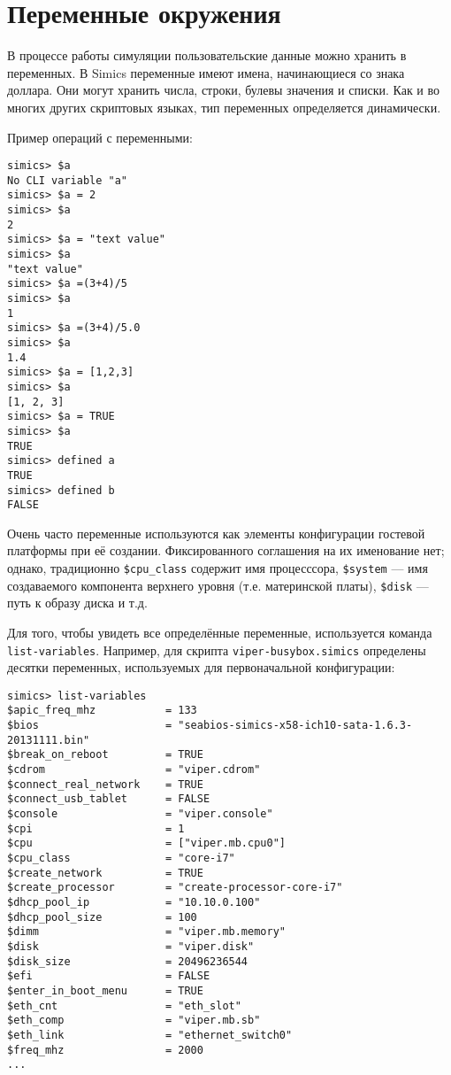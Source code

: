 \section{Переменные окружения}

В процессе работы симуляции пользовательские данные можно хранить в переменных. В Simics переменные имеют имена, начинающиеся со знака доллара. Они могут хранить числа, строки, булевы значения и списки. Как и во многих других скриптовых языках, тип переменных определяется динамически. 

Пример операций с переменными:
\begin{lstlisting}
simics> $a
No CLI variable "a"
simics> $a = 2
simics> $a
2
simics> $a = "text value"
simics> $a
"text value"
simics> $a =(3+4)/5
simics> $a
1
simics> $a =(3+4)/5.0
simics> $a
1.4
simics> $a = [1,2,3]
simics> $a
[1, 2, 3]
simics> $a = TRUE
simics> $a
TRUE
simics> defined a
TRUE
simics> defined b
FALSE
\end{lstlisting}

Очень часто переменные используются как элементы конфигурации гостевой платформы при её создании. Фиксированного соглашения на их именование нет; однако, традиционно \texttt{\$cpu_class} содержит имя процесссора, \texttt{\$system} --- имя создаваемого компонента верхнего уровня (т.е. материнской платы), \texttt{\$disk} --- путь к образу диска и т.д.

Для того, чтобы увидеть все определённые переменные, используется команда \texttt{list-variables}. Например, для скрипта \texttt{viper-busybox.simics} определены десятки переменных, используемых для первоначальной конфигурации:

\begin{lstlisting}
simics> list-variables
$apic_freq_mhz           = 133
$bios                    = "seabios-simics-x58-ich10-sata-1.6.3-20131111.bin"
$break_on_reboot         = TRUE
$cdrom                   = "viper.cdrom"
$connect_real_network    = TRUE
$connect_usb_tablet      = FALSE
$console                 = "viper.console"
$cpi                     = 1
$cpu                     = ["viper.mb.cpu0"]
$cpu_class               = "core-i7"
$create_network          = TRUE
$create_processor        = "create-processor-core-i7"
$dhcp_pool_ip            = "10.10.0.100"
$dhcp_pool_size          = 100
$dimm                    = "viper.mb.memory"
$disk                    = "viper.disk"
$disk_size               = 20496236544
$efi                     = FALSE
$enter_in_boot_menu      = TRUE
$eth_cnt                 = "eth_slot"
$eth_comp                = "viper.mb.sb"
$eth_link                = "ethernet_switch0"
$freq_mhz                = 2000
...
\end{lstlisting}

